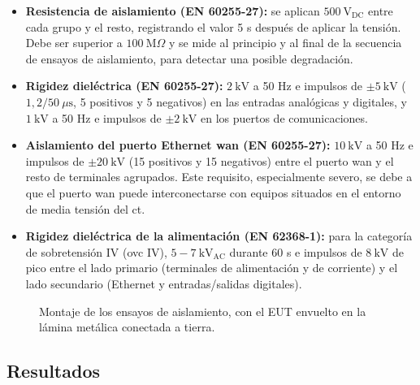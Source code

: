 \begin{itemize}
    \item \textbf{Resistencia de aislamiento (EN 60255-27):} se aplican $500\ \text{V}_{\text{DC}}$ entre cada grupo y el resto, registrando el valor 5 s después de aplicar la tensión. Debe ser superior a $100\ \text{M}\Omega$ y se mide al principio y al final de la secuencia de ensayos de aislamiento, para detectar una posible degradación.
    \item \textbf{Rigidez dieléctrica (EN 60255-27):} $2\ \text{kV}$ a 50 Hz e impulsos de $\pm 5\ \text{kV}$ ($1,2/50\ \mu\text{s}$, 5 positivos y 5 negativos) en las entradas analógicas y digitales, y $1\ \text{kV}$ a 50 Hz e impulsos de $\pm 2\ \text{kV}$ en los puertos de comunicaciones.
    \item \textbf{Aislamiento del puerto Ethernet \gls{wan} (EN 60255-27):} $10\ \text{kV}$ a 50 Hz e impulsos de $\pm 20\ \text{kV}$ (15 positivos y 15 negativos) entre el puerto \gls{wan} y el resto de terminales agrupados. Este requisito, especialmente severo, se debe a que el puerto \gls{wan} puede interconectarse con equipos situados en el entorno de media tensión del \gls{ct}.
    \item \textbf{Rigidez dieléctrica de la alimentación (EN 62368-1):} para la categoría de sobretensión IV (\gls{ovc} IV), $5-7\ \text{kV}_{\text{AC}}$ durante 60 s e impulsos de $8\ \text{kV}$ de pico entre el lado primario (terminales de alimentación y de corriente) y el lado secundario (Ethernet y entradas/salidas digitales).
\end{itemize}

\begin{figure}[htbp]
    \centering
    \caption{Montaje de los ensayos de aislamiento, con el EUT envuelto en la lámina metálica conectada a tierra.}
    \label{fig:setup_aislamiento}
\end{figure}

\subsection{Resultados}
\label{subsec:resultados_aislamiento}

